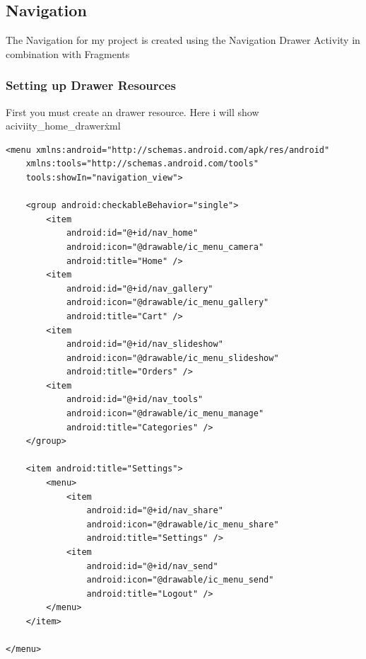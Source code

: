 \subsection{Navigation}

The Navigation for my project is created using the Navigation Drawer Activity in combination with Fragments

\subsubsection{Setting up Drawer Resources}
First you must create an drawer resource. Here i will show aciviity\_home\_drawer\.xml

\begin{verbatim}
<menu xmlns:android="http://schemas.android.com/apk/res/android"
    xmlns:tools="http://schemas.android.com/tools"
    tools:showIn="navigation_view">

    <group android:checkableBehavior="single">
        <item
            android:id="@+id/nav_home"
            android:icon="@drawable/ic_menu_camera"
            android:title="Home" />
        <item
            android:id="@+id/nav_gallery"
            android:icon="@drawable/ic_menu_gallery"
            android:title="Cart" />
        <item
            android:id="@+id/nav_slideshow"
            android:icon="@drawable/ic_menu_slideshow"
            android:title="Orders" />
        <item
            android:id="@+id/nav_tools"
            android:icon="@drawable/ic_menu_manage"
            android:title="Categories" />
    </group>

    <item android:title="Settings">
        <menu>
            <item
                android:id="@+id/nav_share"
                android:icon="@drawable/ic_menu_share"
                android:title="Settings" />
            <item
                android:id="@+id/nav_send"
                android:icon="@drawable/ic_menu_send"
                android:title="Logout" />
        </menu>
    </item>

</menu>

\end{verbatim}

